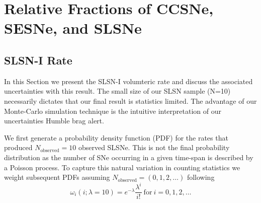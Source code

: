 \documentclass[a4paper,fleqn,usenatbib]{mnras}
\newcommand{\angus}[1]{\color{JungleGreen}#1\color{black}}
\newcommand{\chris}[1]{\color{orange}#1\color{black}}
\begin{document}


\section{Relative Fractions of CCSNe, SESNe, and SLSNe}

\subsection{SLSN-I Rate}
\label{sec:results} %

In this Section we present the SLSN-I volumteric rate and discuss the associated uncertainties with this result. The small size of our SLSN sample (N=10) necessarily dictates that our final result is statistics limited. The advantage of our Monte-Carlo simulation technique is the intuitive interpretation of our uncertainties \angus{Humble brag alert}.

We first generate a probability density function (PDF) for the rates that produced $N_\mathrm{observed}=10$ observed SLSNe. This is not the final probability distribution as the number of SNe occurring in a given time-span is described by a Poisson process. To capture this natural variation in counting statistics we weight subsequent PDFs assuming $N_\mathrm{observed}=(0, 1, 2, \dots)$ following 
\begin{equation}
    \omega_i(i; \lambda=10)=e^{-\lambda }{\frac {\lambda ^{i}}{i!}} \mathrm{~for~} i=0, 1, 2, \dots
\end{equation}
\end{document}
